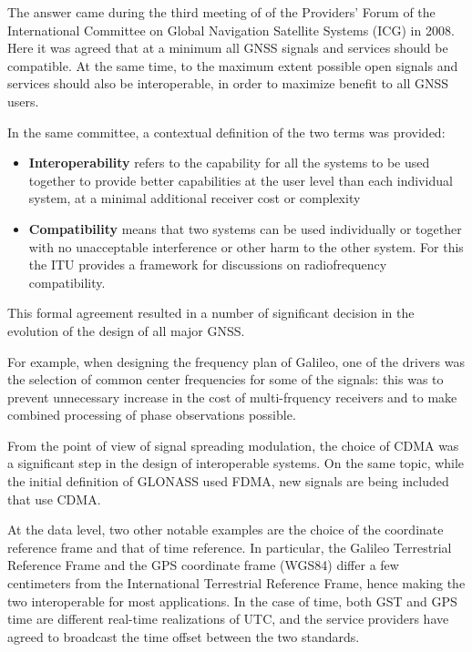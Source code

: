 The answer came during the third meeting of of the Providers' Forum of the
International Committee on Global Navigation Satellite Systems (ICG) in 2008.
Here it was agreed that at a minimum all GNSS signals and services should be
compatible. At the same time, to the maximum extent possible open signals and
services should also be interoperable, in order to maximize benefit to all GNSS
users.

In the same committee, a contextual definition of the two terms was provided:
\begin{itemize}
  \item \textbf{Interoperability} refers to the capability for all the systems
    to be used together to provide better capabilities at the user level than
    each individual system, at a minimal additional receiver cost or complexity
  \item \textbf{Compatibility} means that two systems can be used individually
    or together with no unacceptable interference or other harm to the other
    system. For this the ITU provides a framework for discussions on
    radiofrequency compatibility.
\end{itemize}

\vspace{\baselineskip}

This formal agreement resulted in a number of significant decision in the
evolution of the design of all major GNSS.

For example, when designing the frequency plan of Galileo, one of the drivers
was the selection of common center frequencies for some of the signals: this was
to prevent unnecessary increase in the cost of multi-frquency receivers and to
make combined processing of phase observations possible.

From the point of view of signal spreading modulation, the choice of CDMA was a
significant step in the design of interoperable systems. On the same topic,
while the initial definition of GLONASS used FDMA, new signals are being
included that use CDMA.

At the data level, two other notable examples are the choice of the coordinate
reference frame and that of time reference. In particular, the Galileo
Terrestrial Reference Frame and the GPS coordinate frame (WGS84) differ a few
centimeters from the International Terrestrial Reference Frame, hence making the
two interoperable for most applications. In the case of time, both GST and GPS
time are different real-time realizations of UTC, and the service providers have
agreed to broadcast the time offset between the two standards.

